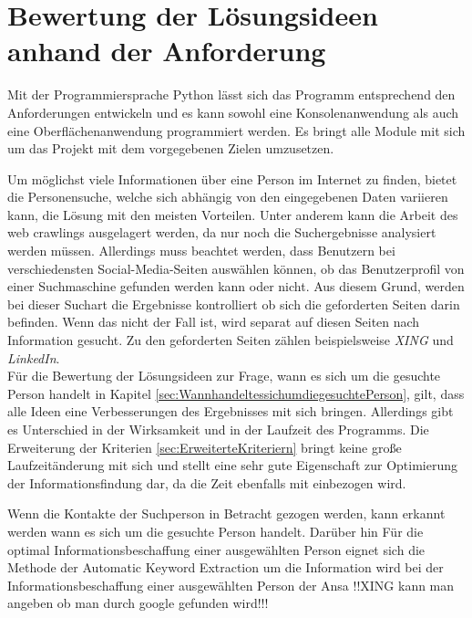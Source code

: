 

\chapter{Bewertung der Lösungsideen anhand der Anforderung}  %
\label{cha:Auswahl der Lösung anhand Anforderungen} %
Mit der Programmiersprache Python lässt sich das Programm entsprechend den Anforderungen entwickeln und es kann sowohl eine Konsolenanwendung als auch eine Oberflächenanwendung programmiert werden. Es bringt alle Module mit sich um das Projekt mit dem vorgegebenen Zielen umzusetzen.

Um möglichst viele Informationen über eine Person im Internet zu finden, bietet die Personensuche, welche sich abhängig von den eingegebenen Daten variieren kann, die Lösung mit den meisten Vorteilen. Unter anderem kann die Arbeit des web crawlings ausgelagert werden, da nur noch die Suchergebnisse analysiert werden müssen. Allerdings muss beachtet werden, dass Benutzern bei verschiedensten Social-Media-Seiten auswählen können, ob das Benutzerprofil von einer Suchmaschine gefunden werden kann oder nicht. Aus diesem Grund, werden bei dieser Suchart die Ergebnisse kontrolliert ob sich die geforderten Seiten darin befinden. Wenn das nicht der Fall ist, wird separat auf diesen Seiten nach Information gesucht. Zu den geforderten Seiten zählen beispielsweise \textit{XING} und \textit{LinkedIn}.\\
Für die Bewertung der Lösungsideen zur Frage, wann es sich um die gesuchte Person handelt in Kapitel \ref{sec:WannhandeltessichumdiegesuchtePerson}, gilt, dass alle Ideen eine Verbesserungen des Ergebnisses mit sich bringen. Allerdings gibt es Unterschied in der Wirksamkeit und in der Laufzeit des Programms. Die Erweiterung der Kriterien \ref{sec:ErweiterteKriteriern} bringt keine große Laufzeitänderung mit sich und stellt eine sehr gute Eigenschaft zur Optimierung der Informationsfindung dar, da die Zeit ebenfalls mit einbezogen wird.

Wenn die Kontakte der Suchperson in Betracht gezogen werden, kann erkannt werden wann es sich um die gesuchte Person handelt. Darüber hin
Für die optimal Informationsbeschaffung einer ausgewählten Person eignet sich die Methode der Automatic Keyword Extraction um die Information wird bei der Informationsbeschaffung einer ausgewählten Person der Ansa
!!XING kann man angeben ob man durch google gefunden wird!!!

